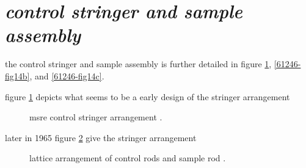 \documentclass[ms,a4paper]{memoir}
\newcommand*{\mrsarchive}{../../msr-archive}%
\begin{document}
\section{\emph{control stringer and sample assembly}}
the control stringer and sample assembly is further detailed in figure \ref{61246-fig14a}, \ref{61246-fig14b}, and \ref{61246-fig14c}.

figure \ref{61246-fig14a} depicts what seems to be a early design of the stringer arrangement
\begin{figure}[H]
  \centering
  \caption{msre control stringer arrangement \parencite[figure 14a]{ad-cf-61-2-46}.}
  \label{61246-fig14a}
\end{figure}
later in 1965 figure \ref{0728-fig5-7} give the stringer arrangement
\begin{figure}[H]
  \centering
  \caption{lattice arrangement of control rods and sample rod \parencite[figure 5.7]{ornl-tm-0728}.}
  \label{0728-fig5-7}
\end{figure}
\end{document}
